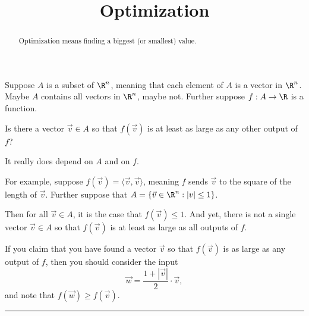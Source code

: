 \documentclass{ximera}
\title{Optimization}
\begin{document}
\begin{abstract}
  Optimization means finding a biggest (or smallest) value.
\end{abstract}\maketitle

Suppose $A$ is a subset of $\R^n$, meaning that each element of $A$ is
a vector in $\R^n$.  Maybe $A$ contains all vectors in $\R^n$, maybe
not.  Further suppose $f : A \to \R$ is a function.

\begin{question}
  Is there a vector $\vec{v} \in A$ so that $f(\vec{v})$ is at least
  as large as any other output of $f$?

  \begin{solution}
    \begin{multiple-choice}
    \end{multiple-choice}
  \end{solution}

  It really does depend on $A$ and on $f$.

  For example, suppose $f(\vec{v}) = \langle \vec{v}, \vec{v}
  \rangle$, meaning $f$ sends $\vec{v}$ to the square of the length of
  $\vec{v}$.  Further suppose that $A = \{ \vec{v} \in \R^n : |v| \le
  1 \}$.

  Then for all $\vec{v} \in A$, it is the case that $f(\vec{v}) \le
  1$.  And yet, there is not a single vector $\vec{v} \in A$ so that
  $f(\vec{v})$ is at least as large as all outputs of $f$.

  If you claim that you have found a vector $\vec{v}$ so that
  $f(\vec{v})$ is as large as any output of $f$, then you should consider the input
  $$
  \vec{w} = \frac{1 + |\vec{v}|}{2} \cdot \vec{v},
  $$
  and note that $f(\vec{w}) \ge f(\vec{v})$.
\end{question}

\hrule
\end{document}
